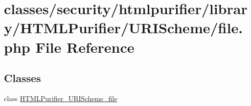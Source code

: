 \hypertarget{file_8php}{\section{classes/security/htmlpurifier/library/\+H\+T\+M\+L\+Purifier/\+U\+R\+I\+Scheme/file.php File Reference}
\label{file_8php}
}
\subsection*{Classes}
\begin{DoxyCompactItemize}
\item 
class \hyperlink{classHTMLPurifier__URIScheme__file}{H\+T\+M\+L\+Purifier\+\_\+\+U\+R\+I\+Scheme\+\_\+file}
\end{DoxyCompactItemize}
